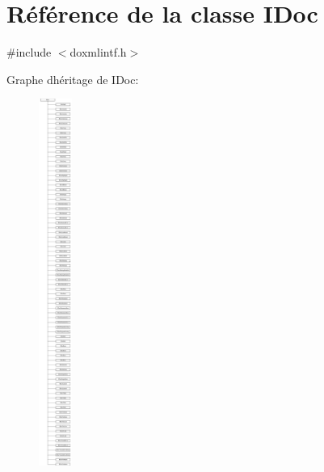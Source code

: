 \hypertarget{class_i_doc}{}\section{Référence de la classe I\+Doc}
\label{class_i_doc}


{\ttfamily \#include $<$doxmlintf.\+h$>$}

Graphe d\textquotesingle{}héritage de I\+Doc\+:\begin{figure}[H]
\begin{center}
\leavevmode
\includegraphics[height=12.000000cm]{class_i_doc}
\end{center}
\end{figure}
